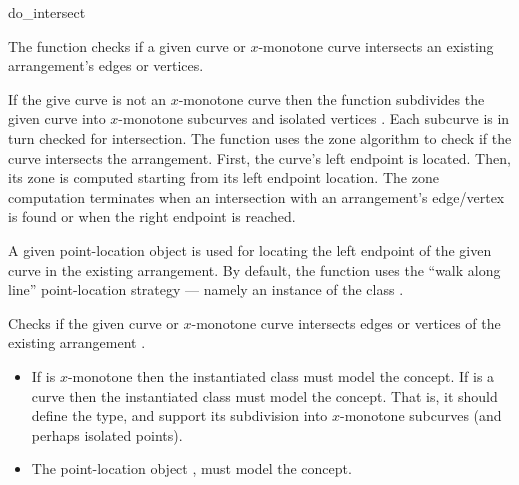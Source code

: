 \ccHtmlNoClassLinks

\ccRefPageBegin

\begin{ccRefFunction}{do_intersect}
\ccDefinition

The function \ccRefName{} checks if a given curve or $x$-monotone
curve intersects an existing arrangement's edges or vertices. 

If the give curve is not an $x$-monotone curve then the function
subdivides the given curve into $x$-monotone subcurves and isolated
vertices . Each subcurve is in turn checked for intersection.
The function uses the zone algorithm to check if the curve intersects
the arrangement. First, the curve's left endpoint is located. Then, 
its zone is computed starting from its left endpoint location. The
zone computation terminates when an intersection with an arrangement's
edge/vertex is found or when the right endpoint is reached. 

A given point-location object is used for locating the left endpoint 
of the given curve in the existing arrangement. By default, the function 
uses the ``walk along line'' point-location strategy --- namely an 
instance of the class 
.



Checks if the given curve or $x$-monotone curve  intersects
  edges or vertices of the existing arrangement .


\ccRequirements
\begin{itemize}
\item If  is $x$-monotone then the instantiated 
  class must model the   concept. If
   is a curve then the instantiated  class must
  model the  concept. That is, it should
  define the  type, and support its subdivision into
  $x$-monotone subcurves (and perhaps isolated points).
\item The point-location object , must model the
   concept.
\end{itemize}

\end{ccRefFunction}

\ccRefPageEnd
